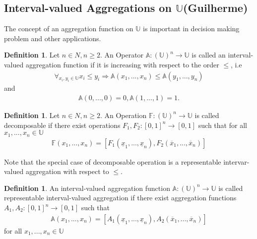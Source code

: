 \documentclass[12pt]{article}
\theoremstyle{plain}
\theoremstyle{remark}
\theoremstyle{definition}
\newtheorem{definition}[theorem]{Definition}
\theoremstyle{proposition}
\newcommand{\UU}{\mathbb{U} }
\begin{document}
\subsection{Interval-valued Aggregations on $\UU$(Guilherme)}

The concept of an aggregation function on $\UU$ is important in decision making problem and other applications.


\begin{definition}\label{def-intAggregation}
Let  $n \in N, n \geq 2$. An Operator $\mathbb{A} : (\UU)^n \rightarrow \UU$ is called an interval-valued aggregation function if it is increasing with respect to the order $\leq$, i.e
\begin{eqnarray}
\forall_{x_i,y_i \in \UU} x_i \leq y_i \Rightarrow \mathbb{A}(x_1,...,x_n) \leq \mathbb{A}(y_1,...,y_n)
\end{eqnarray}
and
\begin{eqnarray*}
\mathbb{A}(0,...,0) = 0, \mathbb{A}(1,...,1) = 1.
\end{eqnarray*}
\end{definition}

\begin{definition}\label{def-intAgDecomposable}
Let  $n \in N, n \geq 2$. An Operation $\mathbb{F} : (\UU)^n \rightarrow \UU$ is called decomposable if there exist operations $F_1, F_2 : [0,1]^n \rightarrow [0, 1]$ such that for all $x_1,...,x_n \in \UU$
\begin{eqnarray}
\mathbb{F}(x_1,...,x_n) = [F_1(\underline{x}_1,..., \underline{x}_n), F_2(\overline{x}_1,..., \overline{x}_n)]
\end{eqnarray}
\end{definition}

Note that the special case of decomposable operation is a representable intervar-valued aggregation with respect to $\leq$.

\begin{definition}\label{def-intAgRepresentable}
An interval-valued aggregation function $\mathbb{A} : (\UU)^n \rightarrow \UU$ is called representable interval-valued aggregation if there exist aggregation functions $A_1, A_2 : [0, 1]^n \rightarrow [0, 1]$ such that
\begin{eqnarray}
\mathbb{A}(x_1,...,x_n) = [A_1(\underline{x}_1,..., \underline{x}_n), A_2(\overline{x}_1,..., \overline{x}_n)]
\end{eqnarray}
for all $x_1,...,x_n \in \UU$
\end{definition}
\end{document}
